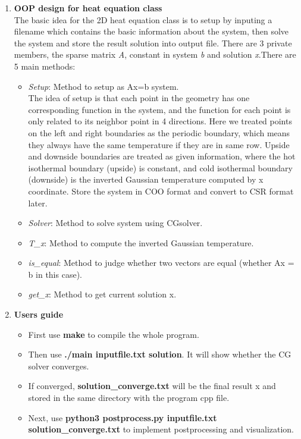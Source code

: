 \documentclass{article}
\begin{document}
\begin{enumerate}
\item \textbf{OOP design for heat equation class}\\
The basic idea for the 2D heat equation class is to setup by inputing a filename which contains the basic information about the system, then solve the system and store the result solution into output file. There are 3 private members, the sparse matrix \emph{A}, constant in system \emph{b} and solution \emph{x}.There are 5 main methods:
\begin{itemize}
\item{\emph{Setup}:} Method to setup as Ax=b system.\\
The idea of setup is that each point in the geometry has one corresponding function in the system, and the function for each point is only related to its neighbor point in 4 directions. Here we treated points on the left and right boundaries as the periodic boundary, which means they always  have the same temperature if they are in same row. Upside and downside boundaries are treated as given information, where the hot isothermal boundary (upside) is constant, and cold isothermal boundary (downside) is the inverted Gaussian temperature computed by x coordinate. Store the system in COO format and convert to CSR format later.
\item{\emph{Solver}:} Method to solve system using CGsolver.
\item{\emph{T\_x}:} Method to compute the inverted Gaussian temperature.
\item{\emph{is\_equal}:} Method to judge whether two vectors are equal (whether Ax = b in this case).
\item{\emph{get\_x}:} Method to get current solution x.\\
\end{itemize}


\item \textbf{Users guide}
\begin{itemize}
\item First use \textbf{make} to compile the whole program.
\item Then use \textbf{./main inputfile.txt solution}. It will show whether the CG solver converges.
\item If converged, \textbf{solution\_converge.txt} will be the final result x and stored in the same directory with the program cpp file.
\item Next, use \textbf{python3 postprocess.py inputfile.txt solution\_converge.txt} to implement postprocessing and visualization.\\
\end{itemize}



\end{enumerate}
\end{document}
